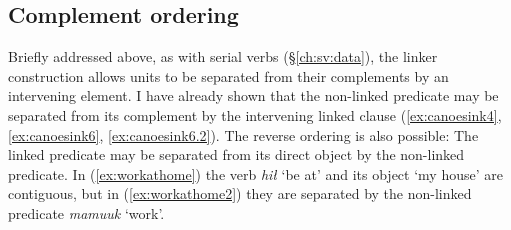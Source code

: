 \begin{comment}
ACTUALLY*2: This works quite well for showing a deictic predicate. Unfortunately it is XL so I cannot use it. Oh well!

ACTUALLY! I think the below is wrong. If you look at XL's sentence, the predicate is deictic ʔaḥʔaa, to which the linker still attaches! This would mean the only counterexample would be Adv V+link. Investigate this further.

But occasionally the linker may occur on the sole predicate in a sentence. This appears to contradict examples (\ref{ex:someonespoke}) and (\ref{ex:*someonespoke}), but the translation provided for these ``dangling" linkers always indicates they are notionally attached to the preceding sentence. I have 1 (TODO: look for more, update number) example from my corpus, involving the word \textit{qʷis} `do so'.\footnote{I am not here counting examples from \textit{tupaat} Julia Lucas, who is unique in always uses the the conjunction \textit{ʔunʔuuƛ} with a linker attached. I believe she has a different lexical entry for the word, and will explain in section (TODO).} I give one example below:

TODO, this is from Charlie Lucas, who I do not have permissions to share. Update it with a sharable example.

Context: \textit{łačiƛni wa. ʔuušciłʔap̓aƛukni nunuuk. ʔuušciłʔap̓aƛukni huyaał.} `We've let it go, haven't we? It has become hard for us to sing. It has become hard for us to dance.'

\ex \label{ex:danglinglinker}
\begingl
\glpreamble ʔaḥʔaa qʷisḥnii.//
\gla ʔaḥʔaa qʷis-(q)ḥ=niˑ //
\glb DDYN do.so-\textsc{link}=\textsc{neut.1pl} //
\glft `That's what happened to us.' //
\endgl
\xe

Although the one predicate is 

\end{comment}


\subsection{Complement ordering} \label{ch:link:participants}

Briefly addressed above, as with serial verbs (\S\ref{ch:sv:data}), the linker construction allows units to be separated from their complements by an intervening element. I have already shown that the non-linked predicate may be separated from its complement by the intervening linked clause (\ref{ex:canoesink4}, \ref{ex:canoesink6}, \ref{ex:canoesink6.2}). The reverse ordering is also possible: The linked predicate may be separated from its direct object by the non-linked predicate. In (\ref{ex:workathome}) the verb \textit{hił} `be at' and its object `my house' are contiguous, but in (\ref{ex:workathome2}) they are separated by the non-linked predicate \textit{mamuuk} `work'.

